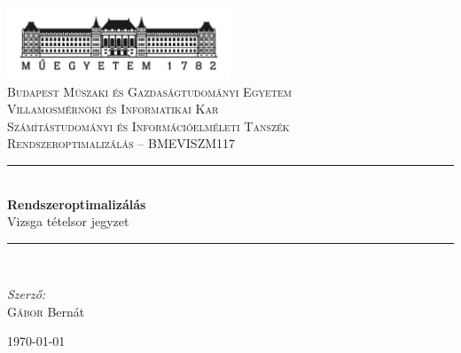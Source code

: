 \hypersetup{pageanchor=false}
\begin{titlepage}
\newcommand{\HRule}{\rule{\linewidth}{0.5mm}}
\begin{center}

\includegraphics[width=0.5\textwidth]{./kepek/Budapest-logo.jpg}\\
\textsc{Budapest Műszaki és Gazdaságtudományi Egyetem}\\
\textsc{Villamosmérnöki és Informatikai Kar}\\
\textsc{Számítástudományi és Információelméleti Tanszék}\\[1.5cm]
\textsc{Rendszeroptimalizálás -- BMEVISZM117}\\[0.5cm]

\HRule \\[0.4cm]
{ \huge \bfseries Rendszeroptimalizálás}\\[0.4cm]
{Vizsga tételsor jegyzet}

\HRule \\[1.5cm]

\begin{minipage}{0.4\textwidth}
\begin{flushleft} \large
\emph{Szerző:}\\
\textsc{Gábor} Bernát
\end{flushleft}
\end{minipage}

\vfill
{\large \today}
\end{center}
\end{titlepage}
\hypersetup{pageanchor=false}
